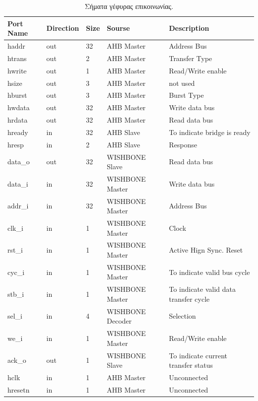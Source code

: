 \documentclass[a4paper,10pt]{article}
\numberwithin{figure}{section}
\numberwithin{table}{section}
\begin{document}
{%
\vspace{0.7cm}
\renewcommand{\arraystretch}{1.2}
\setlength{\tabcolsep}{0.3em}
\newcommand{\mc}[3]{\multicolumn{#1}{#2}{#3}}
\begin{table}[h]
\begin{center}
\begin{tabular}{|l|l|l|l|p{6 cm}|}
\hline
\rowcolor{tcA}
Port Name & Direction & Size  & Sourse & Description\\\hline
haddr & out  & 32 & AHB Master & Address Bus\\\hline
htrans & out & 2 & AHB Master & Transfer Type\\\hline
hwrite & out & 1 &AHB Master & Read/Write enable\\\hline
hsize & out & 3 & AHB Master & not used\\\hline
hburst& out & 3 & AHB Master & Burst Type\\\hline
hwdata & out & 32 & AHB Master & Write data bus\\\hline
hrdata & out & 32 & AHB Master & Read data bus\\\hline
hready & in  & 32 & AHB Slave & To indicate bridge is ready\\\hline
hresp & in & 2 & AHB Slave & Response\\\hline
data\_o & out & 32 & WISHBONE Slave & Read data bus\\\hline
data\_i & in & 32 & WISHBONE Master & Write data bus\\\hline
addr\_i & in & 32 & WISHBONE Master & Address Bus\\\hline
clk\_i & in & 1 & WISHBONE Master & Clock\\\hline
rst\_i& in & 1 & WISHBONE Master & Active Hign Sync. Reset\\\hline
cyc\_i & in  & 1 & WISHBONE Master & To indicate valid bus cycle\\\hline
stb\_i & in & 1 & WISHBONE Master & To indicate valid data transfer cycle\\\hline
sel\_i & in & 4 &WISHBONE Decoder & Selection\\\hline
we\_i & in & 1 & WISHBONE Master & Read/Write enable\\\hline
ack\_o & out & 1 & WISHBONE Slave & To indicate current transfer status\\\hline
hclk & in & 1 & AHB Master & Unconnected\\\hline
hresetn & in & 1 & AHB Master & Unconnected\\\hline
\end{tabular}
\end{center}
\caption{Σήματα γέφυρας επικοινωνίας.}
\end{table}
\vspace{0.7cm}
}%
\end{document}
